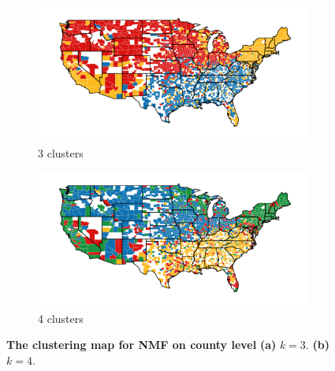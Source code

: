 \begin{figure}[t!]
    \centering
    \begin{subfigure}[t]{0.49\textwidth}
        \includegraphics[width=1.1\textwidth]{fig/nmf-original-data-3cluster}
        \caption{3 clusters}\label{subfig:NMFClustering3Clusters}
    \end{subfigure}
    \begin{subfigure}[t]{0.49\textwidth}
        \includegraphics[width=1.1\textwidth]{fig/nmf-original-data-4cluster}
        \caption{4 clusters}\label{subfig:NMFClustering4Clusters}
    \end{subfigure}
    \caption{\textbf{The clustering map for NMF on county level}
\textbf{(a)} $k=3$. \textbf{(b)} $k=4$.}  \label{fig:NMFClustering}
\end{figure}